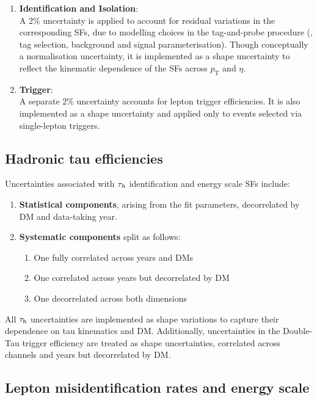 \begin{enumerate}[label=(\roman*)]
\item \textbf{Identification and Isolation}: \\
A 2\% uncertainty is applied to account for residual variations in the corresponding SFs, due to modelling choices in the tag-and-probe procedure (\eg, tag selection, background and signal parameterisation). Though conceptually a normalisation uncertainty, it is implemented as a shape uncertainty to reflect the kinematic dependence of the SFs across $p_{\mathrm{T}}$ and $\eta$.

\item \textbf{Trigger}: \\
A separate 2\% uncertainty accounts for lepton trigger efficiencies. It is also implemented as a shape uncertainty and applied only to events selected via single-lepton triggers.

\end{enumerate}

\subsection{Hadronic tau efficiencies}

Uncertainties associated with $\tau_h$ identification and energy scale SFs include:

\begin{enumerate}[label=(\roman*)]
\item \textbf{Statistical components}, arising from the fit parameters, decorrelated by DM and data-taking year.

\item \textbf{Systematic components} split as follows:
\begin{enumerate}
    \item One fully correlated across years and DMs
    \item One correlated across years but decorrelated by DM
    \item One decorrelated across both dimensions
\end{enumerate}
\end{enumerate}

All $\tau_\mathrm{h}$ uncertainties are implemented as shape variations to capture their dependence on tau kinematics and DM. Additionally, uncertainties in the Double-Tau trigger efficiency are treated as shape uncertainties, correlated across channels and years but decorrelated by DM.

\subsection{Lepton misidentification rates and energy scale}


